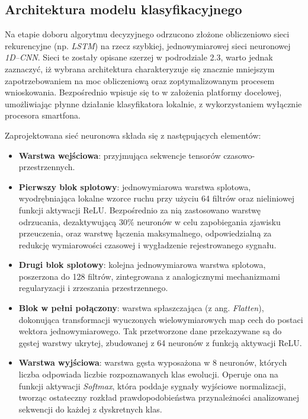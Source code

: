     \subsection{Architektura modelu klasyfikacyjnego}


        Na etapie doboru algorytmu decyzyjnego odrzucono złożone obliczeniowo sieci rekurencyjne (np. \textit{LSTM}) na rzecz szybkiej, jednowymiarowej sieci neuronowej \textit{1D–CNN}. Sieci te zostały opisane szerzej w podrodziale 2.3, warto jednak zaznaczyć, iż wybrana architektura charakteryzuje się znacznie mniejszym zapotrzebowaniem na moc obliczeniową oraz zoptymalizowanym procesem wnioskowania. Bezpośrednio wpisuje się to w założenia platformy docelowej, umożliwiając płynne działanie klasyfikatora lokalnie, z wykorzystaniem wyłącznie procesora smartfona.

        Zaprojektowana sieć neuronowa składa się z następujących elementów:

        \begin{itemize}
            \item \textbf{Warstwa wejściowa}: przyjmująca sekwencje tensorów czasowo-przestrzennych.
            \item \textbf{Pierwszy blok splotowy}: jednowymiarowa warstwa splotowa, wyodrębniająca lokalne wzorce ruchu przy użyciu 64 filtrów oraz nieliniowej funkcji aktywacji ReLU. Bezpośrednio za nią zastosowano warstwę odrzucania, dezaktywującą 30\% neuronów w celu zapobiegania zjawisku przeuczenia, oraz warstwę łączenia maksymalnego, odpowiedzialną za redukcję wymiarowości czasowej i wygładzenie rejestrowanego sygnału.
            \item \textbf{Drugi blok splotowy}: kolejna jednowymiarowa warstwa splotowa, poszerzona do 128 filtrów, zintegrowana z analogicznymi mechanizmami regularyzacji i zrzeszania przestrzennego.
            \item \textbf{Blok w pełni połączony}: warstwa spłaszczająca (z ang. \textit{Flatten}), dokonująca transformacji wyuczonych wielowymiarowych map cech do postaci wektora jednowymiarowego. Tak przetworzone dane przekazywane są do gęstej warstwy ukrytej, zbudowanej z 64 neuronów z funkcją aktywacji ReLU.
            \item \textbf{Warstwa wyjściowa}: warstwa gęsta wyposażona w 8 neuronów, których liczba odpowiada liczbie rozpoznawanych klas ewolucji. Operuje ona na funkcji aktywacji \textit{Softmax}, która poddaje sygnały wyjściowe normalizacji, tworząc ostateczny rozkład prawdopodobieństwa przynależności analizowanej sekwencji do każdej z dyskretnych klas.
        \end{itemize}

